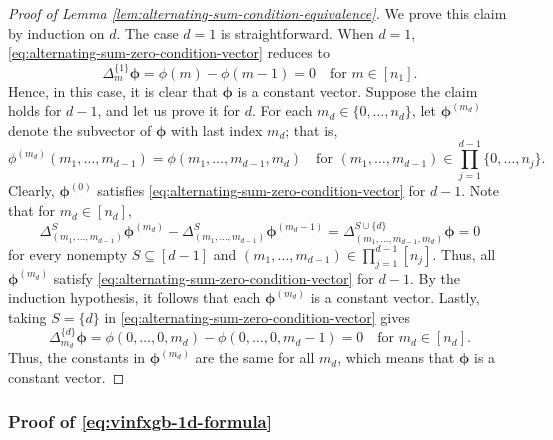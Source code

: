 \documentclass[10pt]{article}
\newcommand{\phibf}{{\boldsymbol{\phi}}}
\begin{document}
\begin{proof}[Proof of Lemma \ref{lem:alternating-sum-condition-equivalence}]
We prove this claim by induction on $d$. The case $d = 1$ is straightforward. 
When $d = 1$, \eqref{eq:alternating-sum-zero-condition-vector} reduces to
\begin{equation*}
    \Delta^{\{1\}}_{m}\phibf = \phi(m) - \phi(m - 1) = 0
    \quad \text{for } m \in [n_1].
\end{equation*}
Hence, in this case, it is clear that $\phibf$ is a constant vector.
Suppose the claim holds for $d - 1$, and let us prove it for $d$.
For each $m_d \in \{0, \dots, n_d\}$, let $\phibf^{(m_d)}$ denote the 
subvector of $\phibf$ with last index $m_d$; that is,
\begin{equation*}
    \phi^{(m_d)}(m_1, \dots, m_{d - 1}) 
    = \phi(m_1, \dots, m_{d - 1}, m_d)
    \quad \text{for } (m_1, \dots, m_{d - 1}) \in 
    \prod_{j = 1}^{d - 1} \{0, \dots, n_j\}.
\end{equation*}
Clearly, $\phibf^{(0)}$ satisfies 
\eqref{eq:alternating-sum-zero-condition-vector} for $d - 1$. Note that
for $m_d \in [n_d]$, 
\begin{equation*}
    \Delta^{S}_{(m_1, \dots, m_{d - 1})}\phibf^{(m_d)}
    - \Delta^{S}_{(m_1, \dots, m_{d - 1})}\phibf^{(m_d - 1)}
    =  \Delta^{S \cup \{d\}}_{(m_1, \dots, m_{d - 1}, m_d)}\phibf
    = 0
\end{equation*}
for every nonempty $S \subseteq [d - 1]$ and $(m_1, \dots, m_{d - 1}) \in 
\prod_{j = 1}^{d - 1} [n_j]$. Thus, all $\phibf^{(m_d)}$ satisfy 
\eqref{eq:alternating-sum-zero-condition-vector} for $d - 1$.
By the induction hypothesis, it follows that each $\phibf^{(m_d)}$ is a 
constant vector. Lastly, taking $S = \{d\}$ in 
\eqref{eq:alternating-sum-zero-condition-vector} gives
\begin{equation*}
    \Delta^{\{d\}}_{m_d}\phibf
    = \phi(0, \dots, 0, m_d) - \phi(0, \dots, 0, m_d - 1) = 0
    \quad \text{for } m_d \in [n_d].
\end{equation*}
Thus, the constants in $\phibf^{(m_d)}$ are the same for all $m_d$,
which means that $\phibf$ is a constant vector.
\end{proof}



\subsubsection{Proof of \eqref{eq:vinfxgb-1d-formula}}
\label{pf:vinfxgb-1d-formula}
\end{document}
